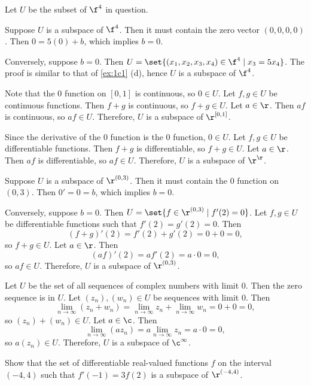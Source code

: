 \begin{sol}
    Let $U$ be the subset of $\f^4$ in question.
    \begin{subexercises}
        \item Suppose $U$ is a subspace of $\f^4$. Then it must contain the zero vector $(0, 0, 0, 0)$. Then $0 = 5(0) + b$, which implies $b = 0$.
        
        Conversely, suppose $b = 0$. Then $U = \set{(x_1, x_2, x_3, x_4) \in \f^4 \mid x_3 = 5x_4}$. The proof is similar to that of \autoref{ex:1c1} (d), hence $U$ is a subspace of $\f^4$.
        \item Note that the 0 function on $[0, 1]$ is continuous, so $0 \in U$. Let $f, g \in U$ be continuous functions. Then $f + g$ is continuous, so $f + g \in U$. Let $a \in \r$. Then $af$ is continuous, so $af \in U$. Therefore, $U$ is a subspace of $\r^{[0, 1]}$.
        \item Since the derivative of the 0 function is the 0 function, $0 \in U$. Let $f, g \in U$ be differentiable functions. Then $f + g$ is differentiable, so $f + g \in U$. Let $a \in \r$. Then $af$ is differentiable, so $af \in U$. Therefore, $U$ is a subspace of $\r^{\r}$.
        \item Suppose $U$ is a subspace of $\r^{(0, 3)}$. Then it must contain the 0 function on $(0, 3)$. Then $0' = 0 = b$, which implies $b = 0$.
        
        Conversely, suppose $b = 0$. Then $U = \set{f \in \r^{(0, 3)} \mid f'(2) = 0}$. Let $f, g \in U$ be differentiable functions such that $f'(2) = g'(2) = 0$. Then
        \[(f + g)'(2) = f'(2) + g'(2) = 0 + 0 = 0,\]
        so $f + g \in U$. Let $a \in \r$. Then
        \[(af)'(2) = a f'(2) = a \cdot 0 = 0,\]
        so $af \in U$. Therefore, $U$ is a subspace of $\r^{(0, 3)}$.
        \item Let $U$ be the set of all sequences of complex numbers with limit 0. Then the zero sequence is in $U$. Let $(z_n), (w_n) \in U$ be sequences with limit 0. Then
        \[\lim_{n \to \infty} (z_n + w_n) = \lim_{n \to \infty} z_n + \lim_{n \to \infty} w_n = 0 + 0 = 0,\]
        so $(z_n) + (w_n) \in U$. Let $a \in \c$. Then
        \[\lim_{n \to \infty} (a z_n) = a \lim_{n \to \infty} z_n = a \cdot 0 = 0,\]
        so $a(z_n) \in U$. Therefore, $U$ is a subspace of $\c^\infty$. \qh
    \end{subexercises}
\end{sol}

\begin{exercise}[1c3]
    Show that the set of differentiable real-valued functions $f$ on the interval $(-4, 4)$ such that $f'(-1) = 3f(2)$ is a subspace of $\r^{(-4, 4)}$.
\end{exercise}

